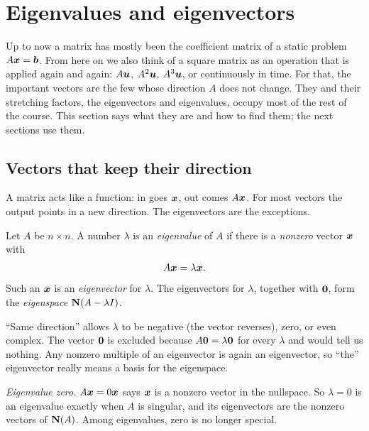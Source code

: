 \section{Eigenvalues and eigenvectors}\label{sec:u23}

Up to now a matrix has mostly been the coefficient matrix of a static problem
$A\boldsymbol{x}=\boldsymbol{b}$. From here on we also think of a square matrix as an operation that is
applied again and again: $A\boldsymbol{u}$, $A^{2}\boldsymbol{u}$, $A^{3}\boldsymbol{u}$, or continuously in time.
For that, the important vectors are the few whose direction $A$ does not change. They and
their stretching factors, the eigenvectors and eigenvalues, occupy most of the rest of the
course. This section says what they are and how to find them; the next sections use them.

\subsection{Vectors that keep their direction}

A matrix acts like a function: in goes $\boldsymbol{x}$, out comes $A\boldsymbol{x}$. For most vectors the
output points in a new direction. The eigenvectors are the exceptions.

\begin{definition}\label{def:u23-eig}
Let $A$ be $n\times n$. A number $\lambda$ is an \emph{eigenvalue} of $A$ if there is a
\emph{nonzero} vector $\boldsymbol{x}$ with
\[
  A\boldsymbol{x}=\lambda\boldsymbol{x}.
\]
Such an $\boldsymbol{x}$ is an \emph{eigenvector} for $\lambda$. The eigenvectors for $\lambda$,
together with $\boldsymbol{0}$, form the \emph{eigenspace} $\mathbf{N}(A-\lambda I)$.
\end{definition}

``Same direction'' allows $\lambda$ to be negative (the vector reverses), zero, or even
complex. The vector $\boldsymbol{0}$ is excluded because $A\boldsymbol{0}=\lambda\boldsymbol{0}$ for every
$\lambda$ and would tell us nothing. Any nonzero multiple of an eigenvector is again an
eigenvector, so ``the'' eigenvector really means a basis for the eigenspace.

\emph{Eigenvalue zero.} $A\boldsymbol{x}=0\boldsymbol{x}$ says $\boldsymbol{x}$ is a nonzero vector in the nullspace.
So $\lambda=0$ is an eigenvalue exactly when $A$ is singular, and its eigenvectors are the
nonzero vectors of $\mathbf{N}(A)$. Among eigenvalues, zero is no longer special.


